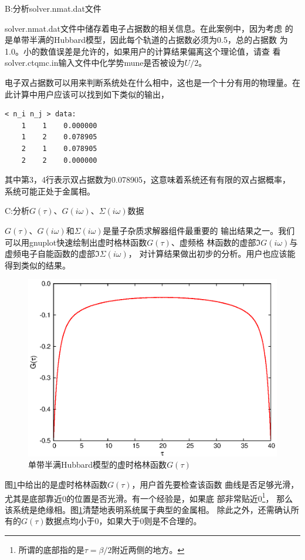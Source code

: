 B:分析solver.nmat.dat文件

solver.nmat.dat文件中储存着电子占据数的相关信息。在此案例中，因为考虑
的是单带半满的Hubbard模型，因此每个轨道的占据数必须为0.5，总的占据数
为1.0。小的数值误差是允许的，如果用户的计算结果偏离这个理论值，请查
看solver.ctqmc.in输入文件中化学势mune是否被设为$U/2$。

电子双占据数可以用来判断系统处在什么相中，这也是一个十分有用的物理量。在
此计算中用户应该可以找到如下类似的输出，
\begin{lstlisting}[frame=single]
< n_i n_j > data:
    1    1    0.000000
    1    2    0.078905
    2    1    0.078905
    2    2    0.000000
\end{lstlisting}

其中第3，4行表示双占据数为0.078905，这意味着系统还有有限的双占据概率，
系统可能正处于金属相。

C:分析$G(\tau)$、$G(i\omega)$、$\Sigma(i\omega)$数据

$G(\tau)$、$G(i\omega)$和$\Sigma(i\omega)$是量子杂质求解器组件最重要的
输出结果之一。我们可以用gnuplot快速绘制出虚时格林函数$G(\tau)$、虚频格
林函数的虚部$\Im G(i\omega)$与虚频电子自能函数的虚部$\Im \Sigma(i\omega)$，
对计算结果做出初步的分析。用户也应该能得到类似的结果。

\begin{figure}
\centering
\includegraphics{figure/green.eps}
\caption{单带半满Hubbard模型的虚时格林函数$G(\tau)$} 
\label{fig:green}
\end{figure}

图\ref{fig:green}中给出的是虚时格林函数$G(\tau)$，用户首先要检查该函数
曲线是否足够光滑，尤其是底部靠近0的位置是否光滑。有一个经验是，如果底
部非常贴近0\footnote{所谓的底部指的是$\tau = \beta/2$附近两侧的地方。}，
那么该系统是绝缘相。图\ref{fig:green}清楚地表明系统属于典型的金属相。
除此之外，还需确认所有的$G(\tau)$数据点均小于0，如果大于0则是不合理的。

